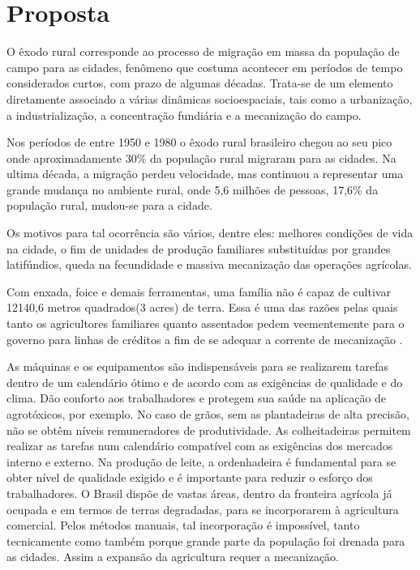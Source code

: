 \chapter{Proposta}
\label{cap:proposta}

O êxodo rural corresponde ao processo de migração em massa da população de campo para as cidades, fenômeno que costuma acontecer em períodos de tempo considerados curtos, com prazo de algumas décadas. Trata-se de um elemento diretamente associado a várias dinâmicas socioespaciais, tais como a urbanização, a industrialização, a concentração fundiária e a mecanização do campo\cite{Pena2013}.

Nos períodos de entre 1950 e 1980 o êxodo rural brasileiro chegou ao seu pico onde aproximadamente 30\% da população rural migraram para as cidades. Na ultima década, a migração perdeu velocidade, mas continuou a representar uma grande mudança no ambiente rural, onde 5,6 milhões de pessoas, 17,6\% da população rural, mudou-se para a cidade\cite{Marra2011}.

Os motivos para tal ocorrência são vários, dentre eles: melhores condições de vida na cidade, o fim de unidades de produção familiares substituídas por grandes latifúndios, queda na fecundidade e massiva mecanização das operações agrícolas.

Com enxada, foice e demais ferramentas, uma família não é capaz de cultivar 12140,6 metros quadrados(3 acres) de terra. Essa é uma das razões pelas quais tanto os agricultores familiares quanto assentados pedem veementemente para o governo para linhas de créditos a fim de se adequar a corrente de mecanização \cite{Alves2013}.

As máquinas e os equipamentos são indispensáveis para se realizarem tarefas dentro de um calendário ótimo e de acordo com as exigências de qualidade e do clima. Dão conforto aos trabalhadores e protegem sua saúde na aplicação de agrotóxicos, por exemplo. No caso de grãos, sem as plantadeiras de alta precisão, não se obtêm níveis remuneradores de produtividade. As colheitadeiras permitem realizar as tarefas num calendário compatível com as exigências dos mercados interno e externo. Na produção de leite, a ordenhadeira é fundamental para se obter nível de qualidade exigido  e é importante para reduzir o esforço dos trabalhadores. O Brasil dispõe de vastas áreas, dentro da fronteira agrícola já ocupada e em termos de terras degradadas, para se incorporarem à agricultura comercial. Pelos métodos manuais, tal incorporação é impossível, tanto tecnicamente como também porque grande parte da população foi drenada para as cidades. Assim a expansão da agricultura requer a mecanização.

